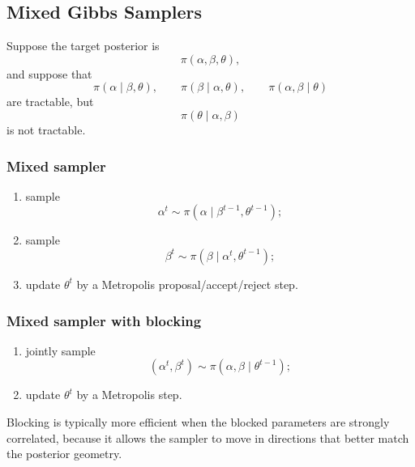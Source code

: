 \documentclass[11pt, titlepage]{article} %
\numberwithin{equation}{section}
\theoremstyle{definition}
\numberwithin{assumption}{section}
\begin{document}
\subsection{Mixed Gibbs Samplers}

Suppose the target posterior is
\begin{equation*}
    \pi(\alpha,\beta,\theta),
\end{equation*}
and suppose that
\begin{equation*}
    \pi(\alpha\mid \beta,\theta),
    \qquad
    \pi(\beta\mid \alpha,\theta),
    \qquad
    \pi(\alpha,\beta\mid\theta)
\end{equation*}
are tractable, but
\begin{equation*}
    \pi(\theta\mid \alpha,\beta)
\end{equation*}
is not tractable. 
\subsubsection*{Mixed sampler}
\begin{enumerate}
    \item sample
    \begin{equation*}
        \alpha^t \sim \pi(\alpha\mid \beta^{t-1},\theta^{t-1});
    \end{equation*}
    \item sample
    \begin{equation*}
        \beta^t \sim \pi(\beta\mid \alpha^t,\theta^{t-1});
    \end{equation*}
    \item update $\theta^t$ by a Metropolis proposal/accept/reject step.
\end{enumerate}

\subsubsection*{Mixed sampler with blocking}
\begin{enumerate}
    \item jointly sample
    \begin{equation*}
        (\alpha^t,\beta^t)\sim \pi(\alpha,\beta\mid \theta^{t-1});
    \end{equation*}
    \item update $\theta^t$ by a Metropolis step.
\end{enumerate}
Blocking is typically more efficient when the blocked parameters are strongly correlated, because it allows the sampler to move in directions that better match the posterior geometry.
\end{document}
